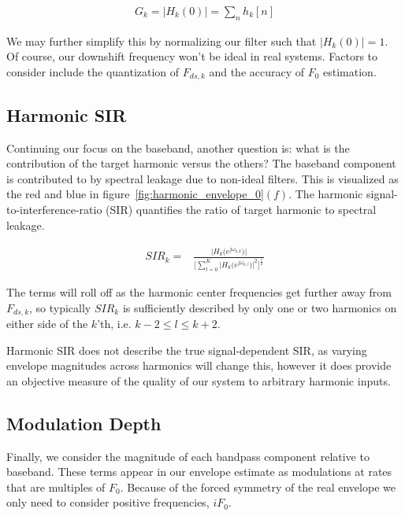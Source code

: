 \documentclass [11pt, proquest] {uwthesis}[2015/03/03]
\begin{document}
\begin{align}
G_k = \Big| H_k(0) \Big| = \sum_n h_k[n]
\end{align}

We may further simplify this by normalizing our filter such that $\Big| H_k(0) \Big| = 1$.  Of course, our downshift frequency won't be ideal in real systems.  Factors to consider include the quantization of $F_{ds,k}$ and the accuracy of $F_0$ estimation.

\subsection{Harmonic SIR}

Continuing our focus on the baseband, another question is: what is the contribution of the target harmonic versus the others?  The baseband component is contributed to by spectral leakage due to non-ideal filters.  This is visualized as the red and blue in figure~\ref{fig:harmonic_envelope_0}$(f)$.  The harmonic signal-to-interference-ratio (SIR) quantifies the ratio of target harmonic to spectral leakage.

\begin{align}
SIR_k =& \frac{\Big| H_k\big(e^{j\omega_{k,k}}\big) \Big|} {\Bigg[ \sum\limits_{l=0}^K \Big|H_k\big(e^{j\omega_{k,l}}\big)\Big|^2 \Bigg] ^ \frac{1}{2}}
\end{align}

The terms will roll off as the harmonic center frequencies get further away from $F_{ds,k}$, so typically $SIR_k$ is sufficiently described by only one or two harmonics on either side of the $k$'th, i.e. $k-2 \leq l \leq k+2$.

Harmonic SIR does not describe the true signal-dependent SIR, as varying envelope magnitudes across harmonics will change this, however it does provide an objective measure of the quality of our system to arbitrary harmonic inputs.


\subsection{Modulation Depth}

Finally, we consider the magnitude of each bandpass component relative to baseband.  These terms appear in our envelope estimate as modulations at rates that are multiples of $F_0$.  Because of the forced symmetry of the real envelope we only need to consider positive frequencies, $iF_0$.
\end{document}
